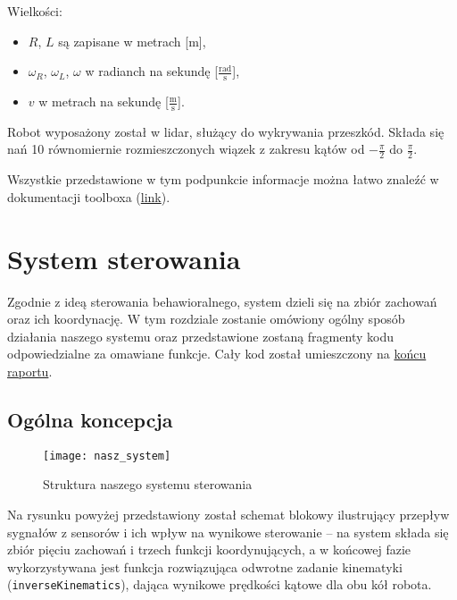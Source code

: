 \documentclass[11pt]{article}
\begin{document}
Wielkości:
\begin{itemize}[--]
\item $R$, $L$ są zapisane w metrach [m],
\item $\omega_R$, $\omega_L$, $\omega$ w radianch na sekundę [$\frac{\text{rad}}{\text{s}}$],
\item $v$ w metrach na sekundę [$\frac{\text{m}}{\text{s}}$].
\end{itemize}

Robot wyposażony został w lidar, służący do wykrywania przeszkód. Składa się nań 10 równomiernie rozmieszczonych wiązek z zakresu kątów od $-\frac{\pi}{2}$ do $\frac{\pi}{2}$.

\vspace{0.5cm}

Wszystkie przedstawione w tym podpunkcie informacje można łatwo znaleźć w dokumentacji toolboxa (\href{https://www.mathworks.com/matlabcentral/fileexchange/66586-mobile-robotics-simulation-toolbox}{link}).

\newpage

\section{System sterowania}

Zgodnie z ideą sterowania behawioralnego, system dzieli się na zbiór zachowań oraz ich koordynację. W tym rozdziale zostanie omówiony ogólny sposób działania naszego systemu oraz przedstawione zostaną fragmenty kodu odpowiedzialne za omawiane funkcje. Cały kod został umieszczony na \hyperref[sec:kod]{końcu raportu}.

\subsection{Ogólna koncepcja}

\begin{figure}[h!]
	\centering
	\texttt{[image: nasz\_system]}
	\caption{Struktura naszego systemu sterowania}
\end{figure}

Na rysunku powyżej przedstawiony został schemat blokowy ilustrujący przepływ sygnałów z sensorów i ich wpływ na wynikowe sterowanie -- na system składa się zbiór pięciu zachowań i trzech funkcji koordynujących, a w końcowej fazie wykorzystywana jest funkcja rozwiązująca odwrotne zadanie kinematyki (\texttt{inverseKinematics}), dająca wynikowe prędkości kątowe dla obu kół robota.
\end{document}
